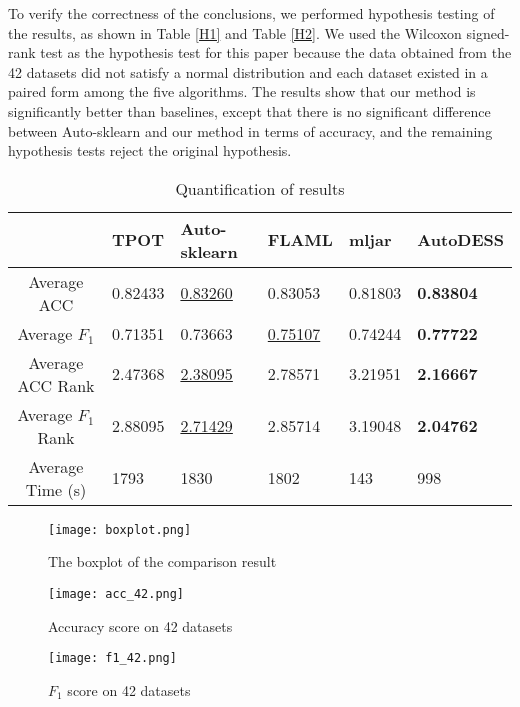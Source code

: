 \documentclass[review]{elsarticle}
\begin{document}
To verify the correctness of the conclusions, we performed hypothesis testing of the results, as shown in Table \ref{H1} and Table \ref{H2}. We used the Wilcoxon signed-rank test\cite{woolson2007wilcoxon} as the hypothesis test for this paper because the data obtained from the 42 datasets did not satisfy a normal distribution and each dataset existed in a paired form among the five algorithms. The results show that our method is significantly better than baselines, except that there is no significant difference between Auto-sklearn and our method in terms of accuracy, and the remaining hypothesis tests reject the original hypothesis.
\begin{table}[htbp]
	\centering
	\caption{Quantification of results}
	\renewcommand\tabularxcolumn[1]{m{#1}}
	\begin{tabularx}{350pt}{cCCCCC}
		\toprule
		&TPOT&Auto-sklearn&FLAML&mljar&AutoDESS\\
		\midrule
		Average ACC&0.82433&\underline{0.83260}&0.83053&0.81803&\textbf{0.83804}\\
		Average $F_1$ &0.71351&0.73663&\underline{0.75107}&0.74244&\textbf{0.77722}\\
		Average ACC Rank&2.47368&\underline{2.38095}&2.78571&3.21951&\textbf{2.16667}\\
		Average $F_1$ Rank&2.88095&\underline{2.71429}&2.85714&3.19048&\textbf{2.04762}\\
		Average Time (s)&1793&1830&1802&143&998\\
		\bottomrule
	\end{tabularx}
\end{table}
\begin{figure}[htbp]
	\centering
	\texttt{[image: boxplot.png]}
	\caption{The boxplot of the comparison result}
\end{figure}
\begin{figure}[htbp]
	\centering
	\texttt{[image: acc\_42.png]}
	\caption{Accuracy score on 42 datasets}
\end{figure}
\begin{figure}[htbp]
	\centering
	\texttt{[image: f1\_42.png]}
	\caption{$F_1$ score on 42 datasets}
\end{figure}
\end{document}
